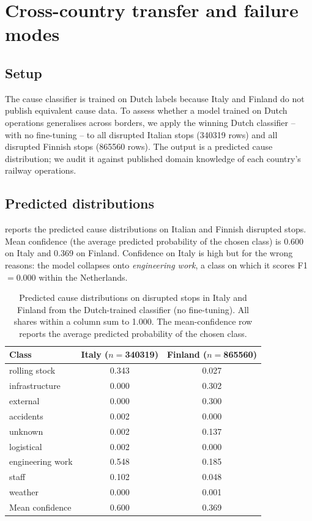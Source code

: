 \section{Cross-country transfer and failure modes}
\label{sec:transfer}

\subsection{Setup}

The cause classifier is trained on Dutch labels because Italy and Finland do not publish equivalent cause data. To assess whether a model trained on Dutch operations generalises across borders, we apply the winning Dutch classifier -- with no fine-tuning -- to all disrupted Italian stops (\num{340319} rows) and all disrupted Finnish stops (\num{865560} rows). The output is a predicted cause distribution; we audit it against published domain knowledge of each country's railway operations.

\subsection{Predicted distributions}

 reports the predicted cause distributions on Italian and Finnish disrupted stops. Mean confidence (the average predicted probability of the chosen class) is \num{0.600} on Italy and \num{0.369} on Finland. Confidence on Italy is high but for the wrong reasons: the model collapses onto \emph{engineering work}, a class on which it scores F1$=$\num{0.000} within the Netherlands.

\begin{table}[H]
    \centering
    \caption{Predicted cause distributions on disrupted stops in Italy and Finland from the Dutch-trained classifier (no fine-tuning). All shares within a column sum to \num{1.000}. The mean-confidence row reports the average predicted probability of the chosen class.}
    \label{tab:transfer}
    \small
    \begin{tabular}{l S[table-format=1.3] S[table-format=1.3]}
        \toprule
        Class & {Italy ($n=$\num{340319})} & {Finland ($n=$\num{865560})} \\
        \midrule
        rolling stock     & 0.343 & 0.027 \\
        infrastructure    & 0.000 & 0.302 \\
        external          & 0.000 & 0.300 \\
        accidents         & 0.002 & 0.000 \\
        unknown           & 0.002 & 0.137 \\
        logistical        & 0.002 & 0.000 \\
        engineering work  & 0.548 & 0.185 \\
        staff             & 0.102 & 0.048 \\
        weather           & 0.000 & 0.001 \\
        \midrule
        Mean confidence   & 0.600 & 0.369 \\
        \bottomrule
    \end{tabular}
\end{table}

